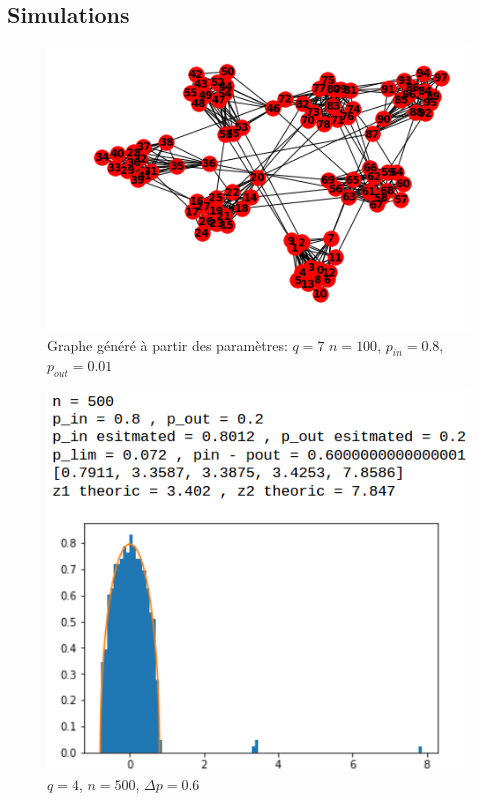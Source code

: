 \subsection{Simulations}
\begin{figure}[H]
\centering
\includegraphics[scale=0.6]{static/graph_q7_n100_pin08_pout0011.png}
\caption{Graphe généré à partir des paramètres: $q=7$ $n=100$, $p_{in}=0.8$, $p_{out}=0.01$}
\end{figure}
\begin{figure}[H]
\centering
\includegraphics[scale=0.6]{static/spectral_q4_n500_pin08_pout02}
\caption{$q=4$, $n=500$, $\Delta p=0.6$}
\label{n500delta-05}
\end{figure}
